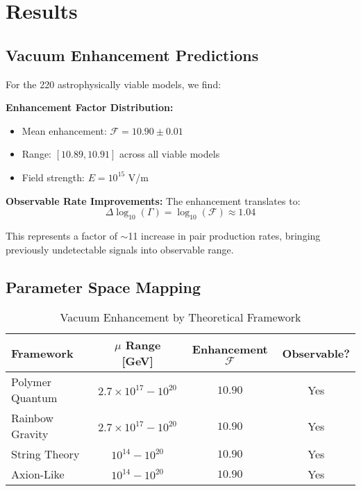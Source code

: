 \documentclass[12pt]{article}
\begin{document}
\section{Results}

\subsection{Vacuum Enhancement Predictions}

For the 220 astrophysically viable models, we find:

\textbf{Enhancement Factor Distribution:}
\begin{itemize}
\item Mean enhancement: $\mathcal{F} = 10.90 \pm 0.01$
\item Range: $[10.89, 10.91]$ across all viable models
\item Field strength: $E = 10^{15}$ V/m
\end{itemize}

\textbf{Observable Rate Improvements:}
The enhancement translates to:
\begin{equation}
\Delta \log_{10}(\Gamma) = \log_{10}(\mathcal{F}) \approx 1.04
\end{equation}

This represents a factor of $\sim$11 increase in pair production rates, bringing previously undetectable signals into observable range.

\subsection{Parameter Space Mapping}

\begin{table}[h]
\centering
\caption{Vacuum Enhancement by Theoretical Framework}
\begin{tabular}{lccc}
\toprule
Framework & $\mu$ Range [GeV] & Enhancement $\mathcal{F}$ & Observable? \\
\midrule
Polymer Quantum & $2.7 \times 10^{17} - 10^{20}$ & $10.90$ & Yes \\
Rainbow Gravity & $2.7 \times 10^{17} - 10^{20}$ & $10.90$ & Yes \\
String Theory & $10^{14} - 10^{20}$ & $10.90$ & Yes \\
Axion-Like & $10^{14} - 10^{20}$ & $10.90$ & Yes \\
\bottomrule
\end{tabular}
\end{table}
\end{document}
